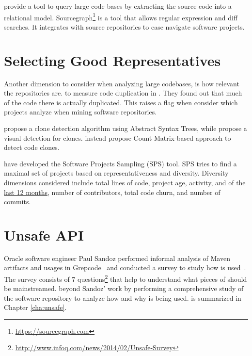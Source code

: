\cite{bajracharyaSourcererInternetscaleSoftware2009} provide a tool to query large code bases by extracting the source code into a relational model.
Sourcegraph\footnote{\url{https://sourcegraph.com}} is a tool that allows regular expression and diff searches.
It integrates with source repositories to ease navigate software projects.

\section{Selecting Good Representatives}
\label{sec:lr:selection}

Another dimension to consider when analyzing large codebases, is how relevant the repositories are.
\cite{lopesDeJaVuMapCode2017}  to measure code duplication in \github{}.
They found out that much of the code there is actually duplicated.
This raises a flag when consider which projects  analyze when  mining software repositories.

\cite{baxterCloneDetectionUsing1998} propose a clone detection algorithm using Abstract Syntax Trees,
while \cite{riegerVisualDetectionDuplicated} propose a visual detection for clones.
\cite{yuanCMCDCountMatrix2011,chenReplicationReproductionCode} instead propose Count Matrix-based approach to detect code clones.

\cite{nagappanDiversitySoftwareEngineering2013} have developed the Software Projects Sampling (SPS) tool.
SPS tries to find a maximal set of projects based on representativeness and diversity.
Diversity dimensions considered include total lines of code,
project age, activity, and \underline{of the last 12 months}, number of contributors, total code churn, and number of commits.


\section{Unsafe API}
\label{sec:lr:unsafe}

Oracle software engineer Paul Sandoz 
performed
informal analysis of Maven artifacts and usages in Grepcode~\citep{sandoz-personal-communication}
and conducted a  survey to study how \unsafe{} is used~\citep{psandoz14}.
The survey consists of 7 questions\footnote{\url{http://www.infoq.com/news/2014/02/Unsafe-Survey}} 
that help to understand what pieces of \smu{} should be mainstreamed.
beyond Sandoz' work
by performing a comprehensive study of the \mavencentral{} software repository to analyze how and why \smu{} is being used.
 is summarized in Chapter \ref{cha:unsafe}.

